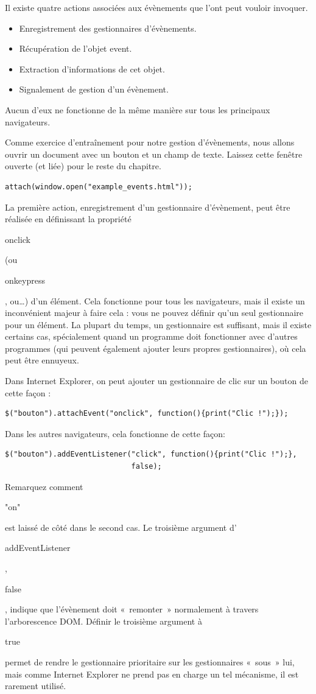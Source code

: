 \documentclass{FramateX}
\renewcommand{\texttt}[1]{\begin{sffamily}{#1}\end{sffamily}}
\begin{document}
Il existe quatre actions associées aux évènements que l'ont peut vouloir
invoquer.

\begin{itemize}
\item
  Enregistrement des gestionnaires d'évènements.
\item
  Récupération de l'objet event.
\item
  Extraction d'informations de cet objet.
\item
  Signalement de gestion d'un évènement.
\end{itemize}
Aucun d'eux ne fonctionne de la même manière sur tous les principaux
navigateurs.

\begin{center}\end{center}

Comme exercice d'entraînement pour notre gestion d'évènements, nous
allons ouvrir un document avec un bouton et un champ de texte. Laissez
cette fenêtre ouverte (et liée) pour le reste du chapitre.

\begin{lstlisting}
attach(window.open("example_events.html"));
\end{lstlisting}
\begin{center}\end{center}

La première action, enregistrement d'un gestionnaire d'évènement, peut
être réalisée en définissant la propriété \texttt{onclick} (ou
\texttt{onkeypress}, ou\ldots{}) d'un élément. Cela fonctionne pour tous
les navigateurs, mais il existe un inconvénient majeur à faire cela :
vous ne pouvez définir qu'un seul gestionnaire pour un élément. La
plupart du temps, un gestionnaire est suffisant, mais il existe certains
cas, spécialement quand un programme doit fonctionner avec d'autres
programmes (qui peuvent également ajouter leurs propres gestionnaires),
où cela peut être ennuyeux.

Dans Internet Explorer, on peut ajouter un gestionnaire de clic sur un
bouton de cette façon :

\begin{lstlisting}
$("bouton").attachEvent("onclick", function(){print("Clic !");});
\end{lstlisting}
Dans les autres navigateurs, cela fonctionne de cette façon:

\begin{lstlisting}
$("bouton").addEventListener("click", function(){print("Clic !");},
                             false);
\end{lstlisting}
Remarquez comment \texttt{"on"} est laissé de côté dans le second cas.
Le troisième argument d'\texttt{addEventListener}, \texttt{false},
indique que l'évènement doit «~remonter~» normalement à travers
l'arborescence DOM. Définir le troisième argument à \texttt{true} permet
de rendre le gestionnaire prioritaire sur les gestionnaires «~sous~»
lui, mais comme Internet Explorer ne prend pas en charge un tel
mécanisme, il est rarement utilisé.
\end{document}
